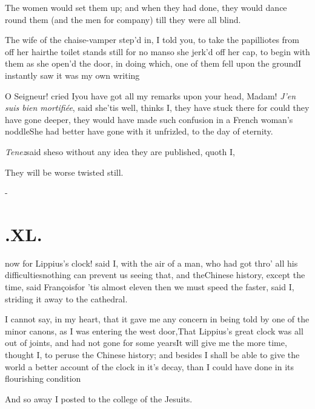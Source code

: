 \documentclass{article}
\begin{document}
The women would set them up; and when they had done, they would
dance round them (and the men for company) till they were all
blind.

The wife of the chaise-vamper step’d in, I told you, to
take the papilliotes from off her hair\tsh the toilet
stands still for no man\tsh so she jerk’d off her
cap, to begin with them as she open’d the door, in doing
which, one of them fell upon the ground\tsk I instantly saw it was my own
writing\tsh

O Seigneur! cried I\tsk you have got all my remarks upon your
head, Madam!\break
\tsh \textit{J’en suis bien
mortifiée}, said she\tsh ’tis well, thinks
I, they have stuck there\break
\tsk for could they have gone deeper,
they would have made such confusion in a French
woman’s noddle\tsk She had better have gone with it
unfrizled, to the day of eternity.

\textit{Tenez}\tsk said she\tsk so without any idea
they are published, quoth I,\tsh

They will be worse twisted still.

\vfill{}\eject
\null\kern-\baselineskip
\section{.\enspace XL.}

 now for Lippius’s
clock! said I, with the air of a man, who had got thro’ all
his difficulties\tsh nothing can prevent us seeing that,
and the\break Chinese history, \etc except the time,\break
said François\tsh for ’tis almost
eleven\break
\tsk then we must speed the faster, said I, striding it
away to the cathedral.

I cannot say, in my heart, that it gave me any concern in being
told by one of the minor canons, as I was entering the west
door,\tsk That Lippius’s great clock was all out of
joints, and had not gone for some years\tsh It will give
me the more time, thought I, to peruse the Chinese history;
and besides I shall be able to give the world a better account of
the
clock in it’s decay, than I could have done in its flourishing
condition\tsh

\tsh And so away I posted to the college of the
Jesuits.
\end{document}
